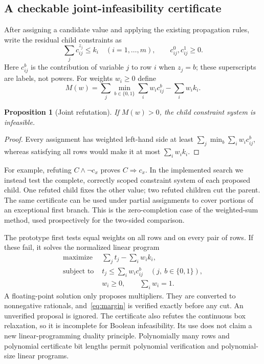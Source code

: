\documentclass[11pt,a4paper]{article}
\newtheorem{proposition}[theorem]{Proposition}
\theoremstyle{definition}
\theoremstyle{remark}
\begin{document}
\subsection{A checkable joint-infeasibility certificate}

After assigning a candidate value and applying the existing propagation
rules, write the residual child constraints as
\[
 \sum_j c_{ij}^{z_j}\le k_i \quad (i=1,\ldots,m),
 \qquad c_{ij}^0,c_{ij}^1\ge0.
\]
Here $c_{ij}^b$ is the contribution of variable $j$ to row $i$ when
$z_j=b$; these superscripts are labels, not powers. For weights $w_i\ge0$
define
\begin{equation}
 M(w)=\sum_j\min_{b\in\{0,1\}}\sum_i w_i c_{ij}^b
                  -\sum_i w_i k_i.                    \label{eq:margin}
\end{equation}

\begin{proposition}[Joint refutation]\label{prop:refutation}
If $M(w)>0$, the child constraint system is infeasible.
\end{proposition}
\begin{proof}
Every assignment has weighted left-hand side at least
$\sum_j\min_b\sum_iw_ic_{ij}^b$, whereas satisfying all rows would make
it at most $\sum_iw_ik_i$.
\end{proof}

For example, refuting $C\wedge\neg c_x$ proves $C\Rightarrow c_x$.
In the implemented search we instead test the complete, correctly scoped
constraint system of each proposed child. One refuted child fixes the
other value; two refuted children cut the parent. The same certificate
can be used under partial assignments to cover portions of an exceptional
first branch. This is the zero-completion case of the weighted-sum
method, used prospectively for the two-sided comparison.

The prototype first tests equal weights on all rows and on every pair
of rows. If these fail, it solves the normalized linear program
\begin{align*}
 \text{maximize }&\sum_j t_j-\sum_iw_i k_i,\\
 \text{subject to }&t_j\le\sum_iw_i c_{ij}^b
                     \quad(j,\ b\in\{0,1\}),\\
 &w_i\ge0,\qquad\sum_iw_i=1.
\end{align*}
A floating-point solution only proposes multipliers. They are converted
to nonnegative rationals, and~\eqref{eq:margin} is verified exactly before
any cut. An unverified proposal is ignored. The certificate also refutes
the continuous box relaxation, so it is incomplete for Boolean
infeasibility. Its use does not claim a new linear-programming duality
principle. Polynomially many rows and polynomial certificate bit lengths
permit polynomial verification and polynomial-size linear programs.
\end{document}
